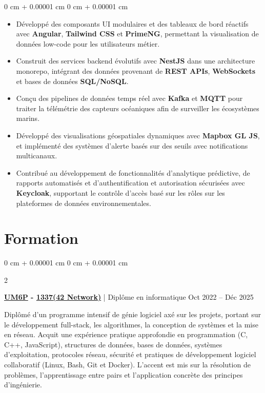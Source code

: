 \documentclass[10pt, letterpaper]{article}
\newenvironment{highlights}{
    \begin{itemize}[
        topsep=0.10 cm,
        parsep=0.10 cm,
        partopsep=0pt,
        itemsep=0pt,
        leftmargin=0 cm + 10pt
    ]
}{
    \end{itemize}
} %
\newenvironment{onecolentry}{
    \begin{adjustwidth}{
        0 cm + 0.00001 cm
    }{
        0 cm + 0.00001 cm
    }
}{
    \end{adjustwidth}
} %
\newenvironment{twocolentry}[2][]{
    \onecolentry
    \def\secondColumn{#2}
    \setcolumnwidth{\fill, 4.5 cm}
    \begin{paracol}{2}
}{
    \switchcolumn \raggedleft \secondColumn
    \end{paracol}
    \endonecolentry
} %
\begin{document}
        \begin{onecolentry}
            \begin{highlights}
                \item Développé des composants UI modulaires et des tableaux de bord réactifs avec \textbf{Angular}, \textbf{Tailwind CSS} et \textbf{PrimeNG}, permettant la visualisation de données low-code pour les utilisateurs métier.
                \item Construit des services backend évolutifs avec \textbf{NestJS} dans une architecture monorepo, intégrant des données provenant de \textbf{REST APIs}, \textbf{WebSockets} et bases de données \textbf{SQL/NoSQL}.
                \item Conçu des pipelines de données temps réel avec \textbf{Kafka} et \textbf{MQTT} pour traiter la télémétrie des capteurs océaniques afin de surveiller les écosystèmes marins.
                \item Développé des visualisations géospatiales dynamiques avec \textbf{Mapbox GL JS}, et implémenté des systèmes d'alerte basés sur des seuils avec notifications multicanaux.
                \item Contribué au développement de fonctionnalités d'analytique prédictive, de rapports automatisés et d'authentification et autorisation sécurisées avec \textbf{Keycloak}, supportant le contrôle d'accès basé sur les rôles sur les plateformes de données environnementales.
            \end{highlights}
        \end{onecolentry}
        \vspace{0.2 cm}


    \section{Formation}
        \begin{twocolentry}{
            Oct 2022 – Déc 2025
        }
        \textbf{\href{https://um6p.ma/}{UM6P} - \href{https://1337.ma/en/}{1337}\href{https://www.42network.org/}{(42 Network)}} | Diplôme en informatique\end{twocolentry}
        \vspace{0.10 cm}

        Diplômé d'un programme intensif de génie logiciel axé sur les projets, portant sur le développement full-stack, les algorithmes, la conception de systèmes et la mise en réseau. Acquit une expérience pratique approfondie en programmation (C, C++, JavaScript), structures de données, bases de données, systèmes d'exploitation, protocoles réseau, sécurité et pratiques de développement logiciel collaboratif (Linux, Bash, Git et Docker). L'accent est mis sur la résolution de problèmes, l'apprentissage entre pairs et l'application concrète des principes d'ingénierie.
\end{document}
